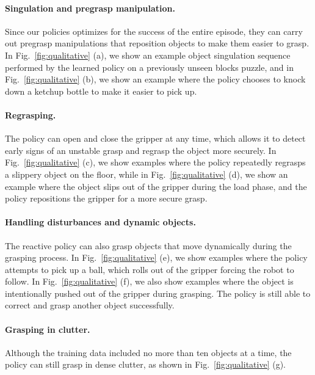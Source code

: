 \documentclass{article}
\begin{document}
\paragraph{Singulation and pregrasp manipulation.}
Since our policies optimizes for the success of the entire episode, they can carry out pregrasp manipulations that reposition objects to make them easier to grasp. In Fig.~\ref{fig:qualitative} (a), we show an example object singulation sequence performed by the learned policy on a previously unseen blocks puzzle, and in Fig.~\ref{fig:qualitative} (b), we show an example where the policy chooses to knock down a ketchup bottle to make it easier to pick up.


\vspace{-0.12in}
\paragraph{Regrasping.}
The policy can open and close the gripper at any time, which allows it to detect early signs of an unstable grasp and regrasp the object more securely. In Fig.~\ref{fig:qualitative} (c), we show examples where the policy repeatedly regrasps a slippery object on the floor, while in Fig.~\ref{fig:qualitative} (d), we show an example where the object slips out of the gripper during the load phase, and the policy repositions the gripper for a more secure grasp.

\vspace{-0.12in}
\paragraph{Handling disturbances and dynamic objects.}
The reactive policy can also grasp objects that move dynamically during the grasping process. In Fig.~\ref{fig:qualitative} (e), we show examples where the policy attempts to pick up a ball, which rolls out of the gripper forcing the robot to follow. In Fig.~\ref{fig:qualitative} (f), we also show examples where the object is intentionally pushed out of the gripper during grasping. The policy is still able to correct and grasp another object successfully.

\vspace{-0.12in}
\paragraph{Grasping in clutter.}
Although the training data included no more than ten objects at a time, the policy can still grasp in dense clutter, as shown in Fig.~\ref{fig:qualitative} (g).
\end{document}
